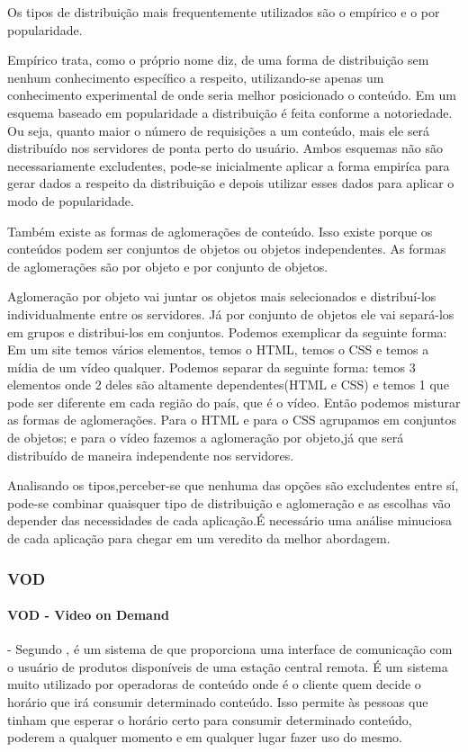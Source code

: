 Os tipos de distribui\c{c}\~ao mais frequentemente utilizados s\~ao o emp\'irico e o por popularidade.

Emp\'irico trata, como o pr\'oprio nome diz, de uma forma de distribui\c{c}\~ao sem nenhum conhecimento espec\'ifico a respeito, utilizando-se apenas um conhecimento experimental de onde seria melhor posicionado o conte\'udo.
 Em um esquema baseado em popularidade a distribui\c{c}\~ao \'e feita conforme a notoriedade. Ou seja, quanto maior o n\'umero de requisi\c{c}\~oes a um conte\'udo, mais ele ser\'a distribu\'ido nos servidores de ponta perto do usu\'ario.
 Ambos esquemas n\~ao s\~ao necessariamente excludentes, pode-se inicialmente aplicar a forma empir\'ica para gerar dados a respeito da distribui\c{c}\~ao e depois utilizar esses dados para aplicar o modo de popularidade.
	
Tamb\'em existe as formas de aglomera\c{c}\~oes de conte\'udo. Isso existe porque os conte\'udos podem ser conjuntos de objetos ou objetos independentes. 
As formas de aglomera\c{c}\~oes s\~ao por objeto e por conjunto de objetos.

Aglomera\c{c}\~ao por objeto vai juntar os objetos mais selecionados e distribu\'i-los individualmente entre os servidores. J\'a por conjunto de objetos ele vai separ\'a-los em grupos e distribui-los em conjuntos. 
 Podemos exemplicar da seguinte forma: Em um site temos v\'arios elementos, temos o HTML, temos o CSS e temos a m\'idia de um v\'ideo qualquer. Podemos separar da seguinte forma: temos 3 elementos onde 2 deles s\~ao altamente dependentes(HTML e CSS) e temos 1 que pode ser diferente em cada regi\~ao do pa\'is, que \'e o v\'ideo. 
 Ent\~ao podemos misturar as formas de aglomera\c{c}\~oes. Para o HTML e para o CSS agrupamos em conjuntos de objetos; e para o v\'ideo fazemos a aglomera\c{c}\~ao por objeto,j\'a que ser\'a distribu\'ido de maneira independente nos servidores.

Analisando os tipos,perceber-se que nenhuma das op\c{c}\~oes s\~ao excludentes entre s\'i, pode-se combinar quaisquer tipo de distribui\c{c}\~ao e aglomera\c{c}\~ao e as escolhas v\~ao depender das necessidades de cada aplica\c{c}\~ao.\'E necess\'ario uma an\'alise minuciosa de cada aplica\c{c}\~ao para chegar em um veredito da melhor abordagem.
\subsubsection{VOD}
\label{subsec:vod}
\paragraph{VOD - Video on Demand} - Segundo \cite{garfinkle1996video}, \'e um sistema de que proporciona uma interface de comunica\c{c}\~ao com o usu\'ario de produtos dispon\'iveis de uma esta\c{c}\~ao central remota.
 \'E um sistema muito utilizado por operadoras de conte\'udo onde \'e o cliente quem decide o hor\'ario que ir\'a consumir determinado conte\'udo.
 Isso permite \`as pessoas que tinham que esperar o hor\'ario certo para consumir determinado conte\'udo, poderem a qualquer momento e em qualquer lugar fazer uso do mesmo.
